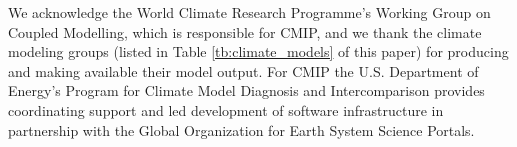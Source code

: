 \documentclass[opre,nonblindrev]{informs3} %
\begin{document}
We acknowledge the World Climate Research Programme's Working Group on Coupled Modelling, which is responsible for CMIP, and we thank the climate modeling groups (listed in Table \ref{tb:climate_models} of this paper) for producing and making available their model output.
For CMIP the U.S. Department of Energy's Program for Climate Model Diagnosis and Intercomparison provides coordinating support and led development of software infrastructure in partnership with the Global Organization for Earth System Science Portals.







\end{document}
